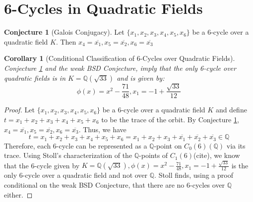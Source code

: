 \documentclass{amsart}
\theoremstyle{plain}
\newtheorem{corollary}[theorem]{Corollary}
\theoremstyle{definition}
\newtheorem{conjecture}[theorem]{Conjecture}
\theoremstyle{remark}
\newcommand{\Q}{\mathbb{Q}}
\begin{document}
\section{6-Cycles in Quadratic Fields}

\begin{conjecture}[Galois Conjugacy]
	\label{conj:gc}
	Let $\{x_1, x_2, x_3, x_4, x_5, x_6\}$ be a $6$-cycle over a 
	quadratic field $K$. Then 
	$x_4 = \overline{x_1}, x_5 = \overline{x_2}, x_6 = \overline{x_3}$
\end{conjecture}

\begin{corollary}[Conditional Classification of 6-Cycles over Quadratic Fields]
	Conjecture \ref{conj:gc} and the weak BSD Conjecture, imply that the only 6-cycle over quadratic fields is in $K = \Q(\sqrt{33})$ and is given by:
	\[
		\phi(x) = x^2 - \frac{71}{48}, x_1 = -1 + \frac{\sqrt{33}}{12}
	\]
\end{corollary}

\begin{proof}
	Let $\{x_1, x_2, x_3, x_4, x_5, x_6\}$ be a $6$-cycle over a 
	quadratic field $K$ and define $t = x_1 + x_2 + x_3 + x_4 + x_5 + x_6$
	to be the trace of the orbit. By Conjecture \ref{conj:gc}, 
	$x_4 = \overline{x_1}, x_5 = \overline{x_2}, x_6 = \overline{x_3}$. Thus, we have
	\[
		t = x_1 + x_2 + x_3 + x_4 + x_5 + x_6 = x_1 + x_2 + x_3 + \overline{x_1} + \overline{x_2} + \overline{x_3} \in \Q
	\]
	Therefore, each 6-cycle can be represented as a $\Q$-point on $C_0(6)(\Q)$ via its trace. 
	Using Stoll's characterization of the $\Q$-points of $C_1(6)$(cite), 
	we know that the 6-cycle given by $K = \Q(\sqrt{33}), \phi(x) = x^2 - \frac{71}{48}, x_1 = -1 + \frac{\sqrt{33}}{12}$
	is the only 6-cycle over a quadratic field and not over $\Q$.
	Stoll finds, using a proof conditional on the weak BSD Conjecture, that there are no 6-cycles over $\Q$ either.
\end{proof}
\end{document}

